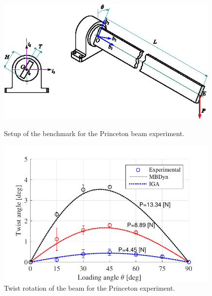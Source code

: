 \documentclass[review]{elsarticle}
\begin{document}
\begin{figure}[ht]
 \begin{minipage}[b]{0.48\linewidth}
    \centering
    \includegraphics[width=0.99\textwidth]{benchmark_princeton/setup_princeton.eps}
    \caption{Setup of the benchmark for the Princeton beam experiment.}
    \label{figB1setup}
 \end{minipage}
 \hspace{0.4cm}
 \begin{minipage}[b]{0.48\linewidth}
    \centering
    \includegraphics[width=0.99\textwidth]{benchmark_princeton/benchmark_princeton_r1.pdf}
    \caption{Twist rotation of the beam for the Princeton experiment.}
    \label{figB1r1}
 \end{minipage}
\end{figure}
\end{document}
